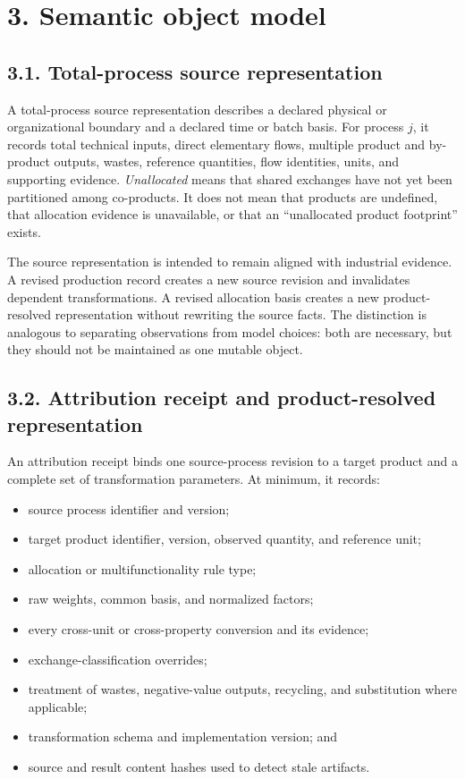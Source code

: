 \documentclass[
  10pt,
  a4paper,
  DIV=11,
  numbers=noendperiod]{scrartcl}
\providecommand{\tightlist}{%
  \setlength{\itemsep}{0pt}\setlength{\parskip}{0pt}}
\begin{document}
\section{3. Semantic object model}\label{semantic-object-model}

\subsection{3.1. Total-process source
representation}\label{total-process-source-representation}

A total-process source representation describes a declared physical or
organizational boundary and a declared time or batch basis. For process
\(j\), it records total technical inputs, direct elementary flows,
multiple product and by-product outputs, wastes, reference quantities,
flow identities, units, and supporting evidence. \emph{Unallocated}
means that shared exchanges have not yet been partitioned among
co-products. It does not mean that products are undefined, that
allocation evidence is unavailable, or that an ``unallocated product
footprint'' exists.

The source representation is intended to remain aligned with industrial
evidence. A revised production record creates a new source revision and
invalidates dependent transformations. A revised allocation basis
creates a new product-resolved representation without rewriting the
source facts. The distinction is analogous to separating observations
from model choices: both are necessary, but they should not be
maintained as one mutable object.

\subsection{3.2. Attribution receipt and product-resolved
representation}\label{attribution-receipt-and-product-resolved-representation}

An attribution receipt binds one source-process revision to a target
product and a complete set of transformation parameters. At minimum, it
records:

\begin{itemize}
\tightlist
\item
  source process identifier and version;
\item
  target product identifier, version, observed quantity, and reference
  unit;
\item
  allocation or multifunctionality rule type;
\item
  raw weights, common basis, and normalized factors;
\item
  every cross-unit or cross-property conversion and its evidence;
\item
  exchange-classification overrides;
\item
  treatment of wastes, negative-value outputs, recycling, and
  substitution where applicable;
\item
  transformation schema and implementation version; and
\item
  source and result content hashes used to detect stale artifacts.
\end{itemize}
\end{document}

